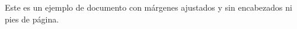 \documentclass{article}
\begin{document}
Este es un ejemplo de documento con márgenes ajustados y sin encabezados ni pies de página.
\end{document}
